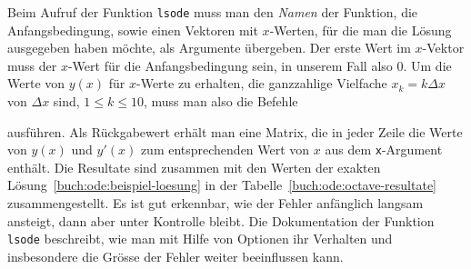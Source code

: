 Beim Aufruf der Funktion \texttt{lsode} muss man den {\em Namen}
der Funktion, die Anfangsbedingung, sowie einen Vektoren mit $x$-Werten,
für die man die Lösung ausgegeben haben möchte, als Argumente
übergeben.
Der erste Wert im $x$-Vektor muss der $x$-Wert für die Anfangsbedingung
sein, in unserem Fall also $0$.
Um die Werte von $y(x)$ für $x$-Werte zu erhalten, die ganzzahlige Vielfache
$x_k=k\Delta x$ von $\Delta x$ sind, $1\le k \le 10$, muss man also die Befehle

ausführen.
Als Rückgabewert erhält man eine Matrix, die in jeder Zeile die
Werte von $y(x)$ und $y'(x)$ zum entsprechenden Wert von $x$
aus dem \texttt{x}-Argument enthält.
Die Resultate sind zusammen mit den Werten der exakten
Lösung~\eqref{buch:ode:beispiel-loesung} 
in der Tabelle~\ref{buch:ode:octave-resultate} zusammengestellt.
Es ist gut erkennbar, wie der Fehler anfänglich langsam ansteigt,
dann aber unter Kontrolle bleibt.
Die Dokumentation der Funktion \texttt{lsode} beschreibt, wie man mit
Hilfe von Optionen ihr Verhalten und insbesondere die Grösse der
Fehler weiter beeinflussen kann.
